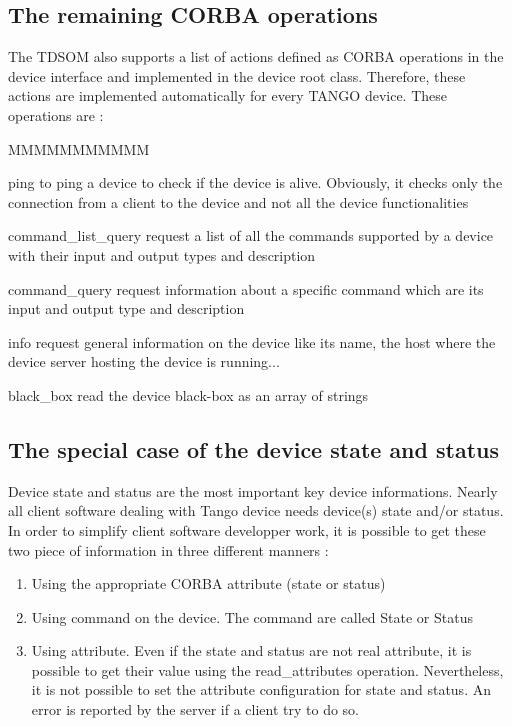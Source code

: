 \subsection{The remaining CORBA operations}

The TDSOM also supports a list of actions defined as CORBA operations
in the device interface and implemented in the device root class.
Therefore, these actions are implemented automatically for every TANGO
device. These operations are :
\begin{lyxlist}{MMMMMMMMMMM}
\item [{ping\index{ping}}] to ping a device to check if the device is
alive. Obviously, it checks only the connection from a client to the
device and not all the device functionalities
\item [{command\_list\_query\index{command-list-query}}] request a list
of all the commands supported by a device with their input and output
types and description
\item [{command\_query\index{command-query}}] request information about
a specific command which are its input and output type and description
\item [{info\index{info}}] request general information on the device like
its name, the host where the device server hosting the device is running...
\item [{black\_box\index{black-box}}] read the device black-box as an
array of strings
\end{lyxlist}

\subsection{The special case of the device state and status}

Device state and status are the most
important key device informations. Nearly all client software dealing
with Tango device needs device(s) state and/or status. In order to
simplify client software developper work, it is possible to get these
two piece of information in three different manners :
\begin{enumerate}
\item Using the appropriate CORBA attribute (state or status)
\item Using command on the device. The command are called State or Status
\item Using attribute. Even if the state and status are not real attribute,
it is possible to get their value using the read\_attributes operation.
Nevertheless, it is not possible to set the attribute configuration
for state and status. An error is reported by the server if a client
try to do so.
\end{enumerate}

